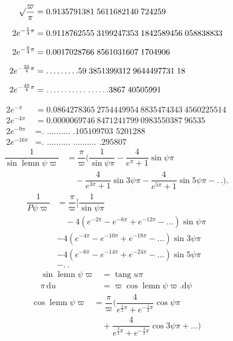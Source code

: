\[
\begin{aligned}
\surd\dfrac{\varpi}{\pi}&=0.9135791381\;5611682140\;724259\\[5pt]
2e^{-\frac14\pi}&=0.9118762555\;3199247353\;1842589456\;058838833\\[5pt]
2e^{-\frac94\pi}&=0.0017028766\;8561031607\;1704906\\[5pt]
2e^{-\frac{25}{4}\pi}&=.\,.\,.\,.\,.\,.\,.\,.\,.59\;3851399312\;9644497731\;18\\[5pt]
2e^{-\frac{49}{4}\pi}&=.\,.\,.\,.\,.\,.\,.\,.\,.\,.\,.\;.\,.\,.\,.\,.\,.3867\;40505991
\end{aligned}
\]



\[
\begin{aligned}
2e^{-\pi}&=0.0864278365\ 2754449954\ 8835474343\ 4560225514\\[5pt]
2e^{-4\pi}&=0.0000069746\ 8471241799\ 0983550387\ 96535\\[5pt]
2e^{-9\pi}&=\text{. .......... .105109703 5201288}\\[5pt]
2e^{-16\pi}&=\text{. .......... .......... .295807}
\end{aligned}
\]
\[
\begin{aligned}\dfrac{1}{\sin\operatorname{lemn}\psi\varpi}
&=\dfrac{\pi}{\varpi}\biggl(\dfrac{1}{\sin\psi\pi}
-\dfrac{4}{e^{\pi}+1}\sin\psi\pi
\\[7pt]&\quad{}-\dfrac{4}{e^{3\pi}+1}\sin3\psi\pi
-\dfrac{4}{e^{5\pi}+1}\sin5\psi\pi-.\,.\biggr).\end{aligned}
\]
\[
\begin{aligned}
\dfrac{1}{P\psi\varpi}
&=\dfrac{\pi}{\varpi}\biggl[\dfrac{1}{\sin\psi\pi}
\\[7pt]&\quad{}-4(e^{-2\pi}-e^{-6\pi}+e^{-12\pi}-\mathord{.}\mathord{.}\mathord{.})\sin\psi\pi\\[5pt]
&-4(e^{-4\pi}-e^{-10\pi}+e^{-18\pi}-\mathord{.}\mathord{.}\mathord{.})\sin3\psi\pi\\[5pt]
&-4(e^{-6\pi}-e^{-14\pi}+e^{-24\pi}-\mathord{.}\mathord{.}\mathord{.})\sin5\psi\pi\\[5pt]
&-.\,.
\end{aligned}
\]
\[
\begin{aligned}
\sin\operatorname{lemn}\psi\varpi&=\operatorname{tang}u\pi\\[5pt]
\pi\,\mathrm{d}u&=\varpi\cos\operatorname{lemn}\psi\varpi.\mathrm{d}\psi
\end{aligned}
\]
\[
\begin{aligned}\cos\operatorname{lemn}\psi\varpi
&=\dfrac{\pi}{\varpi}\biggl(
\dfrac{4}{e^{\frac12\pi}+e^{-\frac12\pi}}\cos\psi\pi
\\[7pt]&\quad{}+\dfrac{4}{e^{\frac32\pi}+e^{-\frac32\pi}}\cos3\psi\pi+\mathord{.}\mathord{.}\mathord{.}\biggr)\end{aligned}
\]
